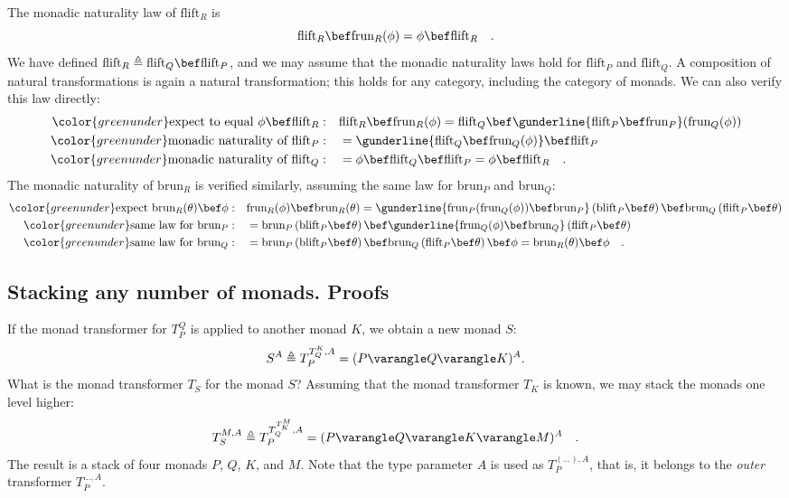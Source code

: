 The monadic naturality law of $\text{flift}_{R}$ is
\[
\text{flift}_{R}\bef\text{frun}_{R}(\phi)=\phi\bef\text{flift}_{R}\quad.
\]
We have defined $\text{flift}_{R}\triangleq\text{flift}_{Q}\bef\text{flift}_{P}$,
and we may assume that the monadic naturality laws hold for $\text{flift}_{P}$
and $\text{flift}_{Q}$. A composition of natural transformations
is again a natural transformation; this holds for any category, including
the category of monads. We can also verify this law directly:
\begin{align*}
{\color{greenunder}\text{expect to equal }\phi\bef\text{flift}_{R}:}\quad & \text{flift}_{R}\bef\text{frun}_{R}(\phi)=\text{flift}_{Q}\bef\gunderline{\text{flift}_{P}\bef\text{frun}_{P}}(\text{frun}_{Q}(\phi))\\
{\color{greenunder}\text{monadic naturality of }\text{flift}_{P}:}\quad & =\gunderline{\text{flift}_{Q}\bef\text{frun}_{Q}(\phi)}\bef\text{flift}_{P}\\
{\color{greenunder}\text{monadic naturality of }\text{flift}_{Q}:}\quad & =\phi\bef\text{flift}_{Q}\bef\text{flift}_{P}=\phi\bef\text{flift}_{R}\quad.
\end{align*}
The monadic naturality of $\text{brun}_{R}$ is verified similarly,
assuming the same law for $\text{brun}_{P}$ and $\text{brun}_{Q}$:
\begin{align*}
{\color{greenunder}\text{expect }\text{brun}_{R}(\theta)\bef\phi:}\quad & \text{frun}_{R}(\phi)\bef\text{brun}_{R}(\theta)=\gunderline{\text{frun}_{P}(\text{frun}_{Q}(\phi))\bef\text{brun}_{P}}\left(\text{blift}_{P}\bef\theta\right)\bef\text{brun}_{Q}\left(\text{flift}_{P}\bef\theta\right)\\
{\color{greenunder}\text{same law for }\text{brun}_{P}:}\quad & =\text{brun}_{P}\left(\text{blift}_{P}\bef\theta\right)\bef\gunderline{\text{frun}_{Q}(\phi)\bef\text{brun}_{Q}}\left(\text{flift}_{P}\bef\theta\right)\\
{\color{greenunder}\text{same law for }\text{brun}_{Q}:}\quad & =\text{brun}_{P}\left(\text{blift}_{P}\bef\theta\right)\bef\text{brun}_{Q}\left(\text{flift}_{P}\bef\theta\right)\bef\phi=\text{brun}_{R}(\theta)\bef\phi\quad.
\end{align*}
 

\subsection{Stacking any number of monads. Proofs\label{subsec:Stacking-any-number-of-monads}}

If the monad transformer for $T_{P}^{Q}$ is applied to another monad
$K$, we obtain a new monad $S$:
\[
S^{A}\triangleq T_{P}^{T_{Q}^{K},A}=(P\varangle Q\varangle K)^{A}.
\]
What is the monad transformer $T_{S}$ for the monad $S$? Assuming
that the monad transformer $T_{K}$ is known, we may stack the monads
one level higher:
\[
T_{S}^{M,A}\triangleq T_{P}^{T_{Q}^{T_{K}^{M}},A}=(P\varangle Q\varangle K\varangle M)^{A}\quad.
\]
The result is a stack of four monads $P$, $Q$, $K$, and $M$. Note
that the type parameter $A$ is used as $T_{P}^{(...),A}$, that is,
it belongs to the \emph{outer} transformer $T_{P}^{...,A}$.

